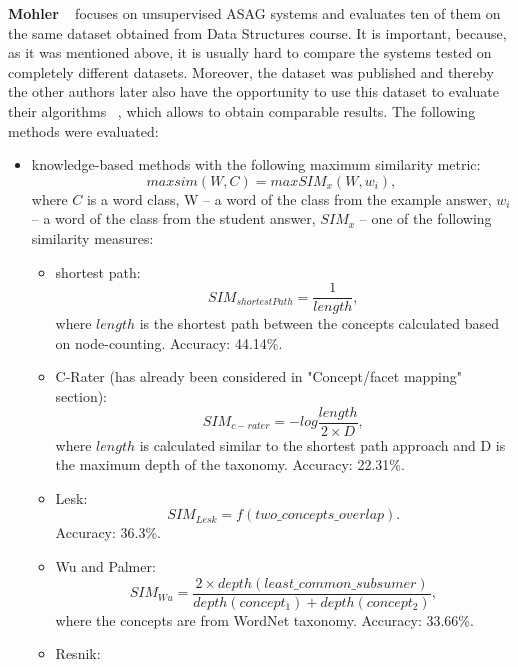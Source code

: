 \documentclass[11pt]{report}
\numberwithin{equation}{section} %
\begin{document}
\textbf{Mohler} ~\cite{Mohler} focuses on unsupervised ASAG systems and evaluates ten of them on the same dataset obtained from  Data Structures course. It is important, because, as it was mentioned above, it is usually hard to compare the  systems tested on completely different datasets. Moreover, the dataset was published and thereby the other authors later also have the opportunity to use this dataset to evaluate their algorithms ~\cite{Sultan}, which allows to obtain comparable results. The following methods were evaluated: 
\begin{itemize}
\item knowledge-based methods with the following maximum similarity metric:
\begin{equation} \label{eq:maxsim}
maxsim(W,C) = max SIM_x(W,w_i),
\end{equation}
where $C$ is a word class, W -- a word of the class from the example answer, $w_i$ -- a word of the class from the student answer, $SIM_x$ -- one of the following similarity measures:
\begin{itemize}
\item shortest path:
\begin{equation} \label{eq:shortestPath}
SIM_{shortestPath} = \frac{1}{length},
\end{equation}
where $length$ is the shortest path between the concepts calculated based on node-counting. Accuracy: 44.14\%.
\item C-Rater (has already been considered in "Concept/facet mapping" section):
\begin{equation} \label{eq:c-rater}
SIM_{c-rater} = -log \frac{length}{2 \times D},
\end{equation}
where $length$ is calculated similar to the shortest path approach and D is the maximum depth of the taxonomy. Accuracy: 22.31\%.
\item Lesk:
\begin{equation} \label{eq:Lesk}
SIM_{Lesk} = f(two\_concepts\_overlap).
\end{equation}
Accuracy: 36.3\%.
\item Wu and Palmer:
\begin{equation} \label{eq:Wu}
SIM_{Wu} = \frac{2 \times depth(least\_common\_subsumer)}{depth(concept_1) + depth(concept_2)},
\end{equation}
where the concepts are from WordNet taxonomy. Accuracy: 33.66\%.
\item Resnik:
\begin{equation} \label{eq:Resnik}

\end{equation}
\end{itemize}
\end{itemize}
\end{document}
